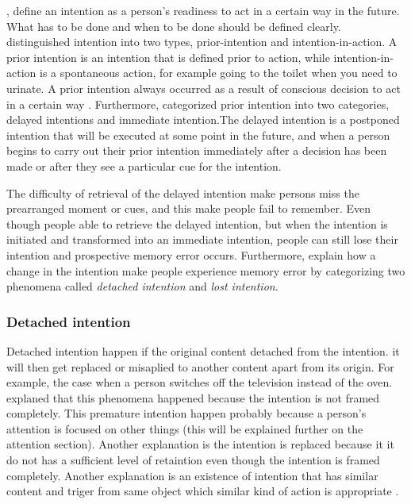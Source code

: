 \cite{LiaKvavilashviliAndJudiEllis}, \cite{gauld1977human} define an intention as a person's readiness to act in a certain way in the future. What has to be done and when to be done should be defined clearly.
\cite{searle1983intentionality} distinguished intention into two types, prior-intention and intention-in-action. A prior intention is an intention that is defined prior to action, while intention-in-action is a spontaneous action, for example going to the toilet when you need to urinate. A prior intention always occurred as a result of conscious decision to act in a certain way \citep{Heckhausen1985-HECFWT}. Furthermore, \cite{gauld1977human} categorized prior intention into two categories, delayed intentions and immediate intention.The delayed intention is a postponed intention that will be executed at some point in the future, and when a person begins to carry out their prior intention immediately after a decision has been made or after they see a particular cue for the intention.


The difficulty of retrieval of the delayed intention make persons miss the prearranged moment or cues, and this make people fail to remember. Even though people able to retrieve the delayed intention, but when the intention is initiated and transformed into an immediate intention,  people can still lose their intention and prospective memory error occurs.
Furthermore, \cite{Reason1984} explain how a change in the intention make people experience memory error by categorizing two phenomena called \textit{detached intention} and \textit{lost intention}.

\subsubsection{Detached intention}

Detached intention happen if the original content detached from the intention. it will then get replaced or misaplied to another content apart from
its origin.
 For example, the case when a person switches off the television instead of the oven. \citep{Reason1984} explaned that this phenomena happened because the intention is not framed completely.
This premature intention happen probably because a person's attention is focused on other things (this will be explained further on the attention section). Another explanation is the intention
is replaced because it it do not has a sufficient level of retaintion even though the intention is framed completely.
 Another explanation is an existence of intention that has similar content and triger from same object which similar kind of action is appropriate \citep{Reason1984}.


